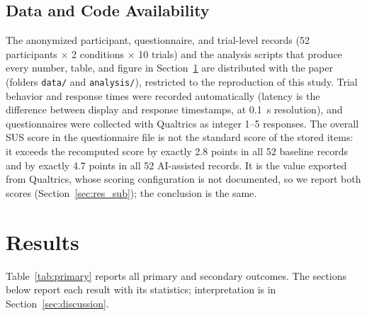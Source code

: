 \documentclass[journal]{IEEEtran}
\theoremstyle{plain}
\theoremstyle{definition}
\begin{document}
    \subsection{Data and Code Availability}
    \label{sec:data}
    The anonymized participant, questionnaire, and trial-level records (52 participants $\times$ 2 conditions $\times$ 10 trials) and the analysis scripts that produce every number, table, and figure in Section~\ref{sec:results} are distributed with the paper (folders \texttt{data/} and \texttt{analysis/}), restricted to the reproduction of this study. Trial behavior and response times were recorded automatically (latency is the difference between display and response timestamps, at 0.1~s resolution), and questionnaires were collected with Qualtrics as integer 1--5 responses. The overall SUS score in the questionnaire file is not the standard score of the stored items: it exceeds the recomputed score by exactly 2.8 points in all 52 baseline records and by exactly 4.7 points in all 52 AI-assisted records. It is the value exported from Qualtrics, whose scoring configuration is not documented, so we report both scores (Section~\ref{sec:res_sub}); the conclusion is the same.

    \section{Results}
    \label{sec:results}
    Table~\ref{tab:primary} reports all primary and secondary outcomes. The sections below report each result with its statistics; interpretation is in Section~\ref{sec:discussion}.
\end{document}
